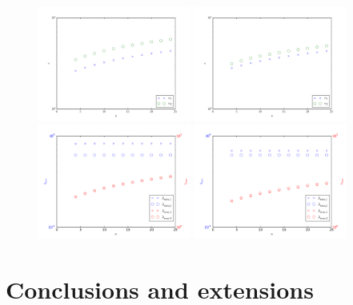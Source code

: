 \documentclass{marine_2015}
\begin{document}
 \begin{figure}[ht]
 \centering
 \includegraphics[width=0.45\textwidth]{img/precond_shen_cond}
 \includegraphics[width=0.45\textwidth]{img/precond_sine_cond}\\
 \includegraphics[width=0.45\textwidth]{img/precond_shen_spectrum}
 \includegraphics[width=0.45\textwidth]{img/precond_sine_spectrum}\\
 \caption{}
 \label{fig:precond}
 \end{figure}



\section{Conclusions and extensions}
\label{sec:end}
%
\end{document}
